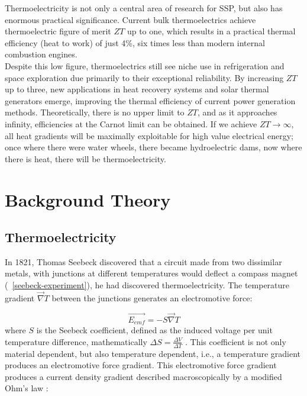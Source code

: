 \documentclass[a4paper,10pt,journal]{IEEEtran}
\newcommand{\figref}[2][\figurename~]{#1\ref{#2}}
\begin{document}
Thermoelectricity is not only a central area of research for
\ac{SSP}, but also has enormous practical significance. Current
bulk thermoelectrics achieve thermoelectric figure of merit $ZT$ up to
one, which results in a practical thermal efficiency (heat to work) of
just 4\%, six times less than modern internal combustion engines.\\
Despite this low figure, thermoelectrics still see niche use
in refrigeration and space exploration due primarily to their
exceptional reliability. By increasing $ZT$ up to three, new
applications in heat recovery systems and solar thermal generators
emerge, improving the thermal efficiency of current power generation
methods. Theoretically, there is no upper limit to $ZT$, and as it
approaches infinity, efficiencies at the Carnot limit can be obtained.
If we achieve $ZT \to\infty$, all heat gradients will be maximally
exploitable for high value electrical energy; once where there were
water wheels, there became hydroelectric dams, now where there is
heat, there will be thermoelectricity.

\section{Background Theory}
\subsection{Thermoelectricity}
In 1821, Thomas Seebeck discovered that a circuit made from two
dissimilar metals, with junctions at different temperatures would
deflect a compass magnet (\figref{seebeck-experiment}), he had
discovered thermoelectricity. The temperature gradient $\vec{\nabla}
T$ between the junctions generates an electromotive force:

\begin{equation}
\label{seebeck-emf}
	\vec{E_{emf}} = -S \vec{\nabla} T
\end{equation}
where $S$ is the Seebeck coefficient, defined as the induced voltage per
unit temperature difference, mathematically $\Delta S = \frac{\Delta
V}{\Delta T}$ \cite{auparay}. This coefficient is not only material
dependent, but also temperature dependent, i.e., a temperature gradient
produces an electromotive force gradient. This electromotive force
gradient produces a current density gradient described macroscopically
by a modified Ohm's law \cite{ziman}:
\end{document}
